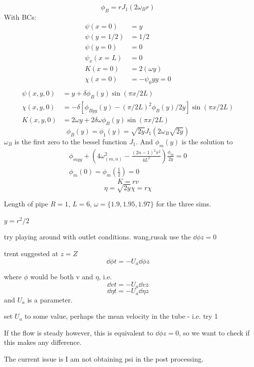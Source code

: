 \documentclass{X:/Documents/Coding/Latex/myreport}
\begin{document}
\[\phi_B = r J_1(2\omega_B r)\]
With BCs:
\begin{align*}
    \psi(x=0) &= y\\
    \psi(y=1/2) &= 1/2\\
    \psi(y=0) &= 0\\
    \psi_x(x=L) &= 0 \\
    K(x=0) &= 2(\omega y)\\
    \chi(x=0) &= - \psi_0{yy} = 0\\
\end{align*}
\begin{align*}
  \psi(x,y,0) &= y + \delta \phi_B(y) \sin(\pi x/2L)\\
  \chi(x,y,0) &= -\delta[\phi_{Byy}(y) -(\pi/2L)^2 \phi_B(y)/2y]\sin(\pi x/2L)\\
  K(x,y,0) &= 2 \omega y + 2  \delta \omega \phi_B(y) \sin (\pi x/2L)
\end{align*}
\[\phi_B(y) = \phi_1(y) = \sqrt{2y} J_1(2\omega_B \sqrt{2y})\]
$\omega_B$ is the first zero to the bessel function $J_1$.
And $\phi_{m}(y)$ is the solution to
\begin{align*}
    \phi_{myy} + \left(4 \omega^2_{(m,n)} - \frac{(2n -1)^2 \pi^2}{4L^2}\right) \frac{\phi_m}{2y} = 0\\
    \phi_m(0) = \phi_m(\frac12) = 0
\end{align*}
\[K = rv\]
\[\eta = \sqrt{2y} \chi = r \chi \]

Length of pipe $R=1$, $L=6$, $\omega = \{1.9,1.95,1.97\}$ for the three sims.

$y = r^2/2$

try playing around with outlet conditions. wang,rusak use the $\dd \phi z = 0$

trent suggested at $z=Z$
\[\dd \phi t = -U_{a} \dd \phi z\]

where $\phi$ would be both v and $\eta$, i.e.
\[\dd vt = - U_{a} \dd v z\]
\[\dd\eta t = - U_{a} \dd \eta z\]
and $U_a$ is a parameter.

set $U_a$ to some value, perhaps the mean velocity in the tube - i.e. try 1

If the flow is steady however, this is equivalent to $\dd \phi z = 0$, so we want to check if this makes any difference.


The current issue is I am not obtaining psi in the post processing.
\end{document}

